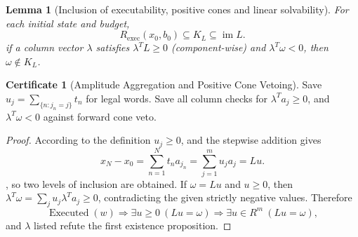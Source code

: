 \documentclass[12pt,a4paper,openany,notitlepage]{report}
\theoremstyle{plain}
\newtheorem{lemma}[theorem]{Lemma}
\theoremstyle{definition}
\newtheorem*{certificate}{Certificate}
\theoremstyle{remark}
\def\mathcal#1{#1}\def\mathsf#1{#1}\def\mathbb#1{#1}%
\begin{document}
\begin{CJK*}
\begin{lemma}
[Inclusion of executability, positive cones and linear solvability]\label{hgov:lem-cone}
For each initial state and budget, \[
 \mathcal R_{\mathrm{exec}}(x_0,b_0)
 \subseteq\mathcal K_L\subseteq\operatorname{im}L.
\] if a column vector $\lambda$ satisfies $\lambda^{\mathsf T}L\ge0$ (component-wise) and $\lambda^{\mathsf T}\omega<0$, then $\omega\notin\mathcal K_L$.\end{lemma}
\begin{certificate}
[Amplitude Aggregation and Positive Cone Vetoing]Save $u_j=\sum_{\{n:j_n=j\}}t_n$ for legal words. Save all column checks for $\lambda^{\mathsf T}a_j\ge0$, and $\lambda^{\mathsf T}\omega<0$ against forward cone veto.\end{certificate}
\begin{proof}
According to the definition $u_j\ge0$, and the stepwise addition gives \[
 x_N-x_0=\sum_{n=1}^Nt_na_{j_n}
 =\sum_{j=1}^mu_ja_j=Lu.
\], so two levels of inclusion are obtained. If $\omega=Lu$ and $u\ge0$, then $\lambda^{\mathsf T}\omega
 =\sum_ju_j\lambda^{\mathsf T}a_j\ge0$, contradicting the given strictly negative values. Therefore \[
 \operatorname{Executed}(w)
 \Longrightarrow\exists u\ge0\ (Lu=\omega)
 \Longrightarrow\exists u\in\mathbb R^m\ (Lu=\omega),
\] and $\lambda$ listed refute the first existence proposition.\end{proof}



\end{CJK*}
\end{document}
